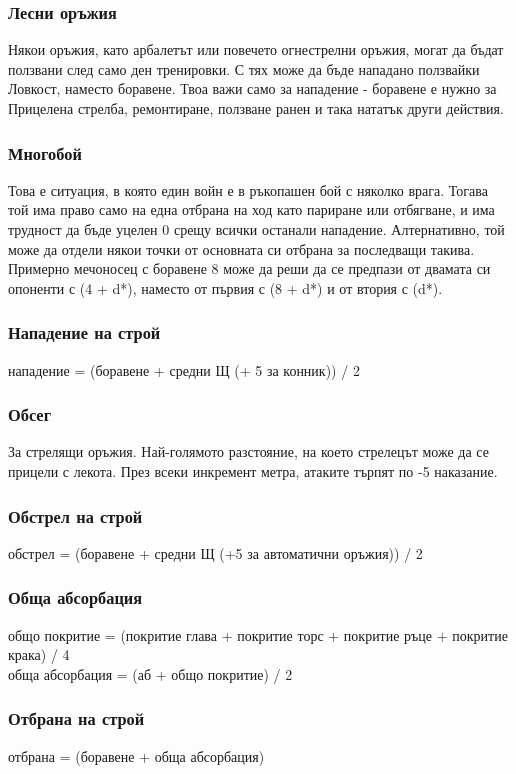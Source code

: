 \subsubsection{Лесни оръжия}
Някои оръжия, като арбалетът или повечето огнестрелни оръжия, могат да бъдат ползвани след само ден тренировки.
С тях може да бъде нападано ползвайки Ловкост, наместо боравене.
Твоа важи само за нападение - боравене е нужно за Прицелена стрелба, ремонтиране, ползване ранен и така нататък други действия.


\subsubsection{Многобой}
Това е ситуация, в която един войн е в ръкопашен бой с няколко врага.
Тогава той има право само на една отбрана на ход като париране или отбягване, и има трудност да бъде уцелен 0 срещу всички останали нападение.
Алтернативно, той може да отдели някои точки от основната си отбрана за последващи такива.
Примерно мечоносец с боравене 8 може да реши да се предпази от двамата си опоненти с (4 + d*), наместо от първия с (8 + d*) и от втория с (d*).


\subsubsection{Нападение на строй}
нападение = (боравене + средни Щ (+ 5 за конник)) / 2


\subsubsection{Обсег}
За стрелящи оръжия.
Най-голямото разстояние, на което стрелецът може да се прицели с лекота.
През всеки инкремент метра, атаките търпят по -5 наказание.


\subsubsection{Обстрел на строй}
обстрел = (боравене + средни Щ (+5 за автоматични оръжия)) / 2


\subsubsection{Обща абсорбация}
общо покритие = (покритие глава + покритие торс + покритие ръце + покритие крака) / 4
\\
обща абсорбация = (аб + общо покритие) / 2


\subsubsection{Отбрана на строй}
отбрана = (боравене + обща абсорбация)


